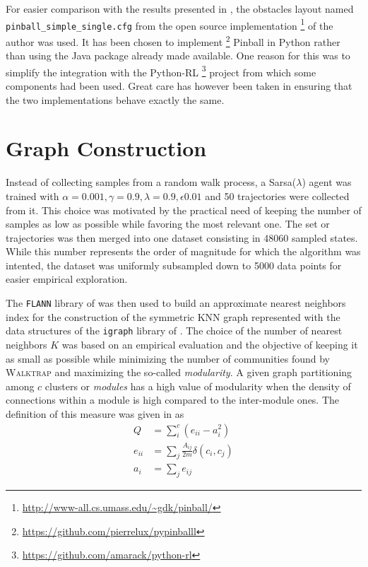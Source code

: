 For easier comparison with the results presented in \cite{Konidaris2009}, the obstacles layout named \texttt{pinball\_simple\_single.cfg} from the open source implementation \footnote{\url{http://www-all.cs.umass.edu/~gdk/pinball/}} of the author was used. It has been chosen to implement \footnote{\url{https://github.com/pierrelux/pypinballl}} Pinball in Python rather than using the Java package already made available. One reason for this was to simplify the integration with the Python-RL \footnote{\url{https://github.com/amarack/python-rl}} project from which some components had been used. Great care has however been taken in ensuring that the two implementations behave exactly the same. 

\section{Graph Construction}

Instead of collecting samples from a random walk process, a Sarsa($\lambda$) agent was trained with $\alpha = 0.001, \gamma = 0.9, \lambda = 0.9, \epsilon 0.01$ and 50 trajectories were collected from it. This choice was motivated by the practical need of keeping the number of samples as low as possible while favoring the most relevant one. The set or trajectories was then merged into one dataset consisting in 48060 sampled states. While this number represents the order of magnitude for which the algorithm was intented, the dataset was uniformly subsampled down to 5000 data points for easier empirical exploration. 

The \texttt{FLANN} library of \cite{Muja2009} was then used to build an approximate nearest neighbors index for the construction of the symmetric KNN graph represented with the data structures of the \texttt{igraph} library of \cite{Csardi2006}. The choice of the number of nearest neighbors $K$ was based on an empirical evaluation and the objective of keeping it as small as possible while minimizing the number of communities found by \textsc{Walktrap} and maximizing the so-called \textit{modularity}. A given graph partitioning among $c$ clusters or \textit{modules} has a high value of modularity when the density of connections within a module is high compared to the inter-module ones. The definition of this measure was given in \cite{Newman2006} as
\begin{align}
Q &= \sum_{i}^c \left( e_{ii} - a_i^2 \right) \\
e_{ii} &= \sum_j 	\frac{A_{ij}}{2m} \delta(c_i, c_j) \\
a_i &= \sum_j e_{ij}
\end{align}

